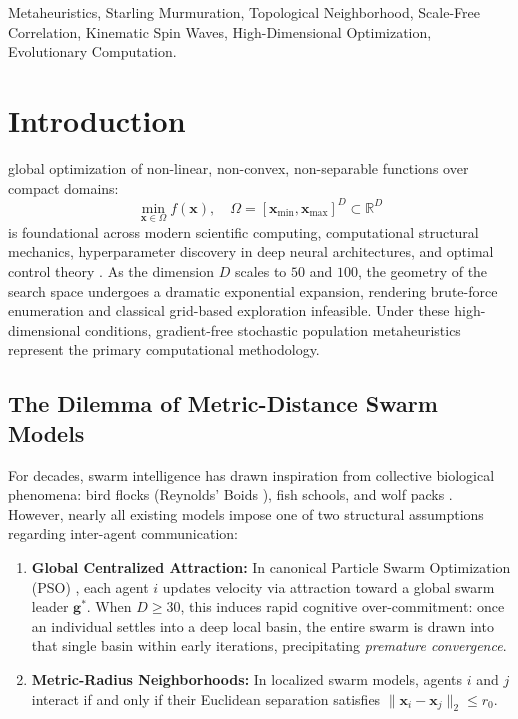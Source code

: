 \documentclass[journal]{IEEEtran}
\begin{document}
\begin{IEEEkeywords}
Metaheuristics, Starling Murmuration, Topological Neighborhood, Scale-Free Correlation, Kinematic Spin Waves, High-Dimensional Optimization, Evolutionary Computation.
\end{IEEEkeywords}

\section{Introduction}
 global optimization of non-linear, non-convex, non-separable functions over compact domains:
\begin{equation}
\min_{\mathbf{x} \in \Omega} f(\mathbf{x}), \quad \Omega = [\mathbf{x}_{\min}, \mathbf{x}_{\max}]^D \subset \mathbb{R}^D
\end{equation}
is foundational across modern scientific computing, computational structural mechanics, hyperparameter discovery in deep neural architectures, and optimal control theory \cite{kennedy1995particle,liang2006comprehensive,tanabe2014improving,hansen2016cma}. As the dimension $D$ scales to $50$ and $100$, the geometry of the search space undergoes a dramatic exponential expansion, rendering brute-force enumeration and classical grid-based exploration infeasible. Under these high-dimensional conditions, gradient-free stochastic population metaheuristics represent the primary computational methodology.

\subsection{The Dilemma of Metric-Distance Swarm Models}
For decades, swarm intelligence has drawn inspiration from collective biological phenomena: bird flocks (Reynolds' Boids \cite{kennedy1995particle}), fish schools, and wolf packs \cite{mirjalili2014grey}. However, nearly all existing models impose one of two structural assumptions regarding inter-agent communication:
\begin{enumerate}
    \item \textbf{Global Centralized Attraction:} In canonical Particle Swarm Optimization (PSO) \cite{kennedy1995particle}, each agent $i$ updates velocity via attraction toward a global swarm leader $\mathbf{g}^*$. When $D \ge 30$, this induces rapid cognitive over-commitment: once an individual settles into a deep local basin, the entire swarm is drawn into that single basin within early iterations, precipitating \textit{premature convergence}.
    \item \textbf{Metric-Radius Neighborhoods:} In localized swarm models, agents $i$ and $j$ interact if and only if their Euclidean separation satisfies $\|\mathbf{x}_i - \mathbf{x}_j\|_2 \le r_0$.
\end{enumerate}
\end{document}
